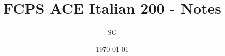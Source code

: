     \title{FCPS ACE Italian 200 - Notes}
    \author{SG}
    \date{\today}
    \maketitle
    \tableofcontents
    
